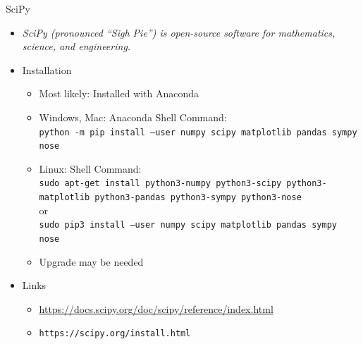 \begin{frame}[fragile]{SciPy}
%
\begin{itemize}
\item \emph{SciPy (pronounced \enquote{Sigh Pie}) is open-source software for mathematics, science, and engineering.}
\item Installation
	\begin{itemize}
	\item Most likely: Installed with Anaconda
	\item Windows, Mac: Anaconda Shell Command:\\
		{\scriptsize \texttt{python -m pip install --user numpy scipy matplotlib pandas sympy nose}}
	\item Linux: Shell Command:\\
		{\scriptsize \texttt{sudo apt-get install python3-numpy python3-scipy python3-matplotlib python3-pandas python3-sympy python3-nose}} \\
		or\\
		{\scriptsize \texttt{sudo pip3 install --user numpy scipy matplotlib pandas sympy nose}}
	\item Upgrade may be needed
	\end{itemize}
\item Links
	\begin{itemize}
	\item \url{https://docs.scipy.org/doc/scipy/reference/index.html}
	\item \texttt{https://scipy.org/install.html}
	\end{itemize}
\end{itemize}
%
\end{frame}


